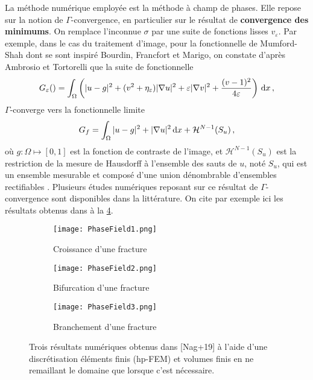 La méthode numérique employée est la méthode à champ de phases. Elle repose sur la notion de $\Gamma$-convergence, en particulier sur le résultat de \textbf{convergence des minimums}. On remplace l'inconnue $\sigma$ par une suite de fonctions lisses $v_\varepsilon$. Par exemple, dans le cas du traitement d'image, pour la fonctionnelle de Mumford-Shah dont se sont inspiré Bourdin, Francfort et Marigo, on constate d'après Ambrosio et Tortorelli \parencite{ambrosio1990approximation} que la suite de fonctionnelle
$$
G_{\varepsilon}() = \int_{\Omega} \left( \vert u-g \vert^2 + (v^2 + \eta_{\varepsilon}) \vert \nabla u \vert^2 + \varepsilon \vert \nabla v \vert^2 + \frac{(v-1)^2}{4\varepsilon} \right) \diff x \,,
$$
$\Gamma$-converge vers la fonctionnelle limite 
$$
G_f = \int_{\Omega} \vert u-g \vert^2 + \vert \nabla u \vert^2 \diff x + \mathcal{H}^{N-1}(S_u) \,,
$$
où $g:\Omega \mapsto [0,1]$ est la fonction de contraste de l’image, et $\mathcal{H}^{N-1}(S_u)$ est la restriction de la mesure de Hausdorff à l’ensemble des sauts de $u$, noté $S_u$, qui est un ensemble mesurable et composé d’une union dénombrable d’ensembles rectifiables \parencite[pp.35-37]{balasoiu2020halthesis}. Plusieurs études numériques reposant sur ce résultat de $\Gamma$-convergence sont disponibles dans la littérature. On cite par exemple ici les résultats obtenus dans \parencite{nagaraja2019phase} à la \cref{fig:PhaseField}.

\begin{figure}[!ht]
    \centering
    \begin{subfigure}[b]{0.9\textwidth}
        \centering
        \texttt{[image: PhaseField1.png]} 
        \caption{Croissance d’une fracture}
        \label{fig:PhaseField1}
    \end{subfigure}
    \begin{subfigure}[b]{0.9\textwidth}
        \centering
        \texttt{[image: PhaseField2.png]} 
        \caption{Bifurcation d’une fracture}
        \label{fig:PhaseField2}
    \end{subfigure}
    \begin{subfigure}[b]{0.9\textwidth}
        \centering
        \texttt{[image: PhaseField3.png]} 
        \caption{Branchement d’une fracture}
        \label{fig:PhaseField3}
    \end{subfigure}
       \caption{Trois résultats numériques obtenus dans [Nag+19] à l'aide d'une discrétisation éléments finis (hp-FEM) et volumes finis en ne remaillant le domaine que lorsque c'est nécessaire.}
       \label{fig:PhaseField}
\end{figure}


